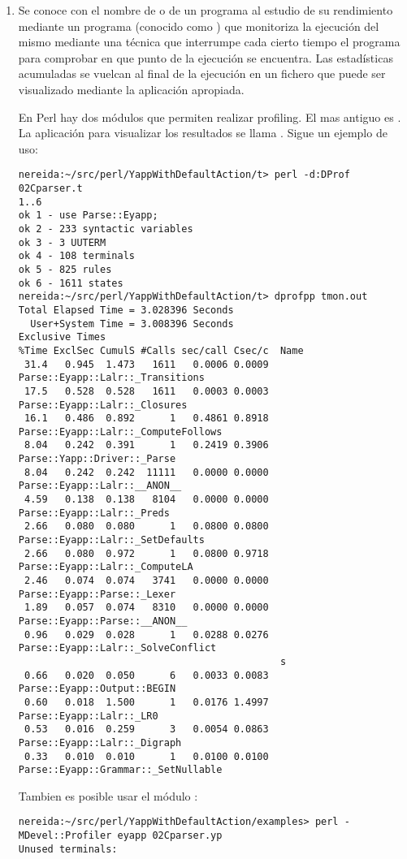 \begin{enumerate}
\item
Se conoce con el nombre de  o  de
un programa al estudio de su rendimiento mediante un programa
(conocido como ) que monitoriza la ejecución del mismo
mediante una técnica que interrumpe cada cierto tiempo el programa
para comprobar en que punto de la ejecución se encuentra.
Las estadísticas acumuladas se vuelcan al final de la ejecución 
en un fichero que puede ser visualizado mediante la aplicación apropiada.

En Perl hay dos módulos que permiten realizar profiling. El mas antiguo es
. La aplicación para visualizar los resultados
se llama .
Sigue un ejemplo de uso:

\begin{verbatim}
nereida:~/src/perl/YappWithDefaultAction/t> perl -d:DProf 02Cparser.t
1..6
ok 1 - use Parse::Eyapp;
ok 2 - 233 syntactic variables
ok 3 - 3 UUTERM
ok 4 - 108 terminals
ok 5 - 825 rules
ok 6 - 1611 states
nereida:~/src/perl/YappWithDefaultAction/t> dprofpp tmon.out
Total Elapsed Time = 3.028396 Seconds
  User+System Time = 3.008396 Seconds
Exclusive Times
%Time ExclSec CumulS #Calls sec/call Csec/c  Name
 31.4   0.945  1.473   1611   0.0006 0.0009  Parse::Eyapp::Lalr::_Transitions
 17.5   0.528  0.528   1611   0.0003 0.0003  Parse::Eyapp::Lalr::_Closures
 16.1   0.486  0.892      1   0.4861 0.8918  Parse::Eyapp::Lalr::_ComputeFollows
 8.04   0.242  0.391      1   0.2419 0.3906  Parse::Yapp::Driver::_Parse
 8.04   0.242  0.242  11111   0.0000 0.0000  Parse::Eyapp::Lalr::__ANON__
 4.59   0.138  0.138   8104   0.0000 0.0000  Parse::Eyapp::Lalr::_Preds
 2.66   0.080  0.080      1   0.0800 0.0800  Parse::Eyapp::Lalr::_SetDefaults
 2.66   0.080  0.972      1   0.0800 0.9718  Parse::Eyapp::Lalr::_ComputeLA
 2.46   0.074  0.074   3741   0.0000 0.0000  Parse::Eyapp::Parse::_Lexer
 1.89   0.057  0.074   8310   0.0000 0.0000  Parse::Eyapp::Parse::__ANON__
 0.96   0.029  0.028      1   0.0288 0.0276  Parse::Eyapp::Lalr::_SolveConflict
                                             s
 0.66   0.020  0.050      6   0.0033 0.0083  Parse::Eyapp::Output::BEGIN
 0.60   0.018  1.500      1   0.0176 1.4997  Parse::Eyapp::Lalr::_LR0
 0.53   0.016  0.259      3   0.0054 0.0863  Parse::Eyapp::Lalr::_Digraph
 0.33   0.010  0.010      1   0.0100 0.0100  Parse::Eyapp::Grammar::_SetNullable
\end{verbatim}         

Tambien es posible usar el módulo :
\begin{verbatim}
nereida:~/src/perl/YappWithDefaultAction/examples> perl -MDevel::Profiler eyapp 02Cparser.yp
Unused terminals:


\end{verbatim}
\end{enumerate}
